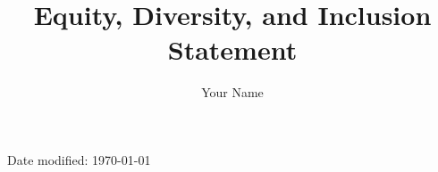\documentclass[12pt]{article}
\title{Equity, Diversity, and Inclusion Statement}
\author{Your Name}
\date{} %
\begin{document}
\maketitle


\vfill
\centering Date modified: \today
\end{document}
